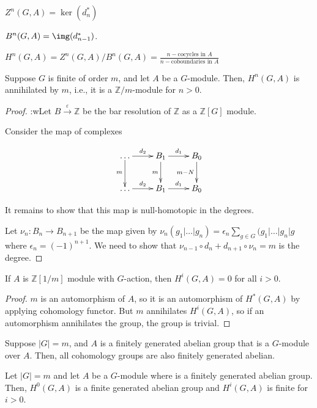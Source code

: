 \documentclass[12pt]{scrartcl}
\begin{document}
$Z^n(G, A) = \ker(d_n^{*})$

$B^n(G, A) = \img(d_{n-1}^{*})$.


$H^n(G, A) = Z^n(G, A)/B^n(G, A) = \frac{n-\textrm{cocycles in }A }{n-\textrm{coboundaries in }A} $ 

\begin{theorem}
	Suppose $G$ is finite of order $m$, and let $A$ be a $G$-module.
	Then, $H^n(G, A)$ is annihilated by $m$, i.e., it is a $\mathbb{Z}/m$-module for $n>0$. 
\end{theorem}

\begin{proof}

:wLet $B \xrightarrow{\varepsilon} \mathbb{Z}$ be the bar resolution of $\mathbb{Z}$ as a $\mathbb{Z}[G]$ module.

Consider the map of complexes

\[
\xymatrix{
	\dots \ar[r]^{d_2} \ar[d]_{m} & B_1 \ar[r]^{d_1}\ar[d]_{m}& B_0 \ar[d] _{m-N} \\
	\dots \ar[r]^{d_2} & B_1 \ar[r]^{d_1} & B_0 \\
}
\] 

It remains to show that this map is null-homotopic in the degrees.

Let $\nu_n: B_n \to B_{n+1}$ be the map given by $\nu_n(g_1 | \dots | g_n) = \epsilon_n \sum_{g \in G} (g_1 | \dots | g_n | g$
where $\epsilon_n = (-1)^{n+1}$.
We need to show that $\nu_{n-1} \circ d_n + d_{n+1} \circ \nu_n = m$ is the degree. 

\end{proof}

\begin{corollary}
	If $A$ is $\mathbb{Z}[1/m]$ module with $G$-action, then $H^i(G, A) = 0$ for all $i>0$.  
\end{corollary}
\begin{proof}
$m$ is an automorphism of $A$, so it is an automorphism of $H^*(G, A)$ by applying cohomology functor.
But $m$ annihilates $H^i(G, A)$, so if an automorphism annihilates the group, the group is trivial. 
\end{proof}

\begin{lemma}
Suppose $|G| = m$, and $A$ is a finitely generated abelian group that is a $G$-module over $A$.
Then, all cohomology groups are also finitely generated abelian.
\end{lemma}

\begin{corollary}
Let $|G| = m$ and let $A$ be a $G$-module where is a finitely generated abelian group.
Then, $H^0(G, A)$ is a finite generated abelian group and $H^i(G, A)$ is finite for $i>0$.  
\end{corollary}
\end{document}
